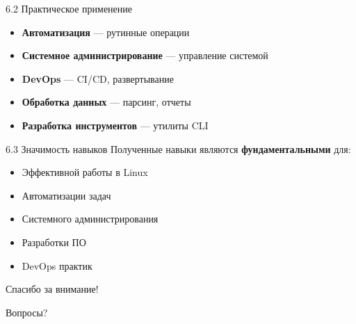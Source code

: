 \documentclass[
  ignorenonframetext,
  aspectratio=169,
  russian,
]{beamer}
\providecommand{\tightlist}{%
  \setlength{\itemsep}{0pt}\setlength{\parskip}{0pt}}
\begin{document}
\begin{frame}{6.2 Практическое применение}
\label{ux43fux440ux430ux43aux442ux438ux447ux435ux441ux43aux43eux435-ux43fux440ux438ux43cux435ux43dux435ux43dux438ux435}
\begin{itemize}[<+->]
\tightlist
\item
  \textbf{Автоматизация} --- рутинные операции
\item
  \textbf{Системное администрирование} --- управление системой
\item
  \textbf{DevOps} --- CI/CD, развертывание
\item
  \textbf{Обработка данных} --- парсинг, отчеты
\item
  \textbf{Разработка инструментов} --- утилиты CLI
\end{itemize}
\end{frame}

\begin{frame}{6.3 Значимость навыков}
\label{ux437ux43dux430ux447ux438ux43cux43eux441ux442ux44c-ux43dux430ux432ux44bux43aux43eux432}
Полученные навыки являются \textbf{фундаментальными} для:

\begin{itemize}[<+->]
\tightlist
\item
  Эффективной работы в Linux
\item
  Автоматизации задач
\item
  Системного администрирования
\item
  Разработки ПО
\item
  DevOps практик
\end{itemize}
\end{frame}

\begin{frame}[standout]{6.4 }
\label{section}
Спасибо за внимание!

Вопросы?
\end{frame}
\end{document}

